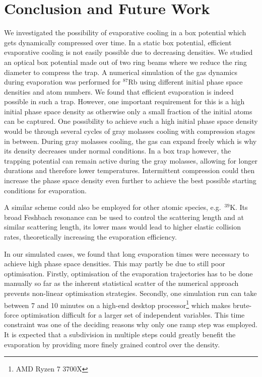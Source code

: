

\chapter{Conclusion and Future Work}
We investigated the possibility of evaporative cooling in a box potential which gets dynamically compressed over time. In a static box potential, efficient evaporative cooling is not easily possible due to decreasing densities. We studied an optical box potential made out of two ring beams where we reduce the ring diameter to compress the trap. A numerical simulation of the gas dynamics during evaporation was performed for $^{87}$Rb using different initial phase space densities and atom numbers. We found that efficient evaporation is indeed possible in such a trap. However, one important requirement for this is a high initial phase space density as otherwise only a small fraction of the initial atoms can be captured.
One possibility to achieve such a high initial phase space density would be through several cycles of gray molasses cooling with compression stages in between. During gray molasses cooling, the gas can expand freely which is why its density decreases under normal conditions. In a box trap however, the trapping potential can remain active during the gray molasses, allowing for longer durations and therefore lower temperatures. Intermittent compression could then increase the phase space density even further to achieve the best possible starting conditions for evaporation.

A similar scheme could also be employed for other atomic species, e.g.\ $^{39}$K. Its broad Feshbach resonance can be used to control the scattering length \cite{k39Feshbach} and at similar scattering length, its lower mass would lead to higher elastic collision rates, theoretically increasing the evaporation efficiency.

In our simulated cases, we found that long evaporation times were necessary to achieve high phase space densities. This may partly be due to still poor optimisation.
Firstly, optimisation of the evaporation trajectories has to be done manually so far as the inherent statistical scatter of the numerical approach prevents non-linear optimisation strategies. Secondly, one simulation run can take between 7 and 10 minutes on a high-end desktop processor\footnote{AMD Ryzen 7 3700X} which makes brute-force optimisation difficult for a larger set of independent variables. This time constraint was one of the deciding reasons why only one ramp step was employed. It is expected that a subdivision in multiple steps could greatly benefit the evaporation by providing more finely grained control over the density.

